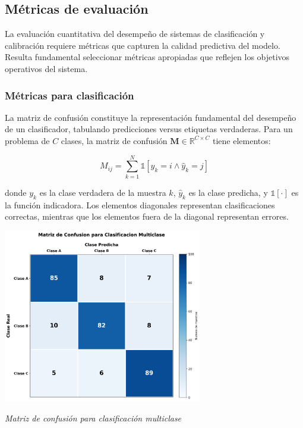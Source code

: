 \subsection{Métricas de evaluación}

La evaluación cuantitativa del desempeño de sistemas de clasificación y calibración requiere métricas que capturen la calidad predictiva del modelo. Resulta fundamental seleccionar métricas apropiadas que reflejen los objetivos operativos del sistema.

\subsubsection{Métricas para clasificación}

La matriz de confusión constituye la representación fundamental del desempeño de un clasificador, tabulando predicciones versus etiquetas verdaderas. Para un problema de $C$ clases, la matriz de confusión $\mathbf{M} \in \mathbb{R}^{C \times C}$ tiene elementos:

\begin{equation}
M_{ij} = \sum_{k=1}^{N} \mathbb{1}[y_k = i \land \hat{y}_k = j]
\end{equation}

donde $y_k$ es la clase verdadera de la muestra $k$, $\hat{y}_k$ es la clase predicha, y $\mathbb{1}[\cdot]$ es la función indicadora. Los elementos diagonales representan clasificaciones correctas, mientras que los elementos fuera de la diagonal representan errores.

\begin{table}[h]
\centering
\includegraphics[width=0.65\textwidth]{imagenes/matriz_confusion_ejemplo.png}
\caption{\textit{Matriz de confusión para clasificación multiclase}}
\label{fig:matriz_confusion}
\end{table}

